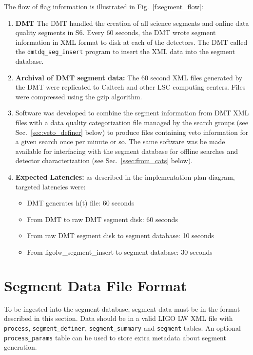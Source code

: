 The flow of flag information is illustrated in
Fig.~\ref{f:segment_flow}:
%
\begin{enumerate}
\item \textbf{DMT} The DMT handled
the creation of all science segments and online data quality segments
in S6. Every 60 seconds, the DMT wrote segment
information in XML format to disk at each of the detectors. The DMT called
the \texttt{dmtdq\_seg\_insert} program to insert the XML data into
the segment database.

\item \textbf{Archival of DMT segment data:} The 60 second XML files
generated by the DMT were replicated to Caltech and other LSC
computing centers. Files were compressed using the gzip algorithm.

\item Software was developed to combine the segment
information from DMT XML files with a data quality categorization file
managed by the search groups (see Sec.~\ref{sec:veto_definer}
below) to produce files containing veto information for a given search
once per minute or so.  The same software was be made available for
interfacing with the segment database for offline searches and
detector characterization (see Sec.~\ref{ssec:from_cats}
below).

\item \textbf{Expected Latencies:} as described in the implementation plan
diagram, targeted latencies were:
\begin{itemize}
\item DMT generates h(t) file: 60 seconds
\item From DMT to raw DMT segment disk: 60 seconds
\item From raw DMT segment disk to segment database: 10 seconds
\item From ligolw\_segment\_insert to segment database: 30 seconds
\end{itemize}
\end{enumerate}



\section{Segment Data File Format}
\label{sec:data_file_format}

To be ingested into the segment database, segment data must be in the
format described in this section. Data should be in a valid LIGO LW
XML file with \verb|process|, \verb|segment_definer|,
\verb|segment_summary| and \verb|segment| tables. An optional
\verb|process_params| table can be used to store extra metadata about
segment generation.

